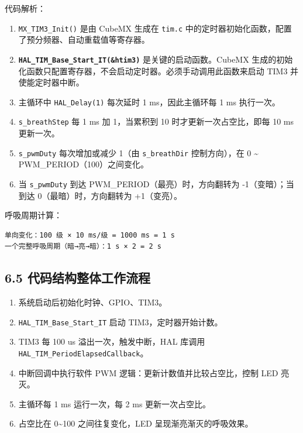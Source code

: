 \documentclass[
  chinese,
  UTF8,
  oneside,
  openany]{ctexbook}
\providecommand{\tightlist}{%
  \setlength{\itemsep}{0pt}\setlength{\parskip}{0pt}}
\begin{document}
代码解析：

\begin{enumerate}
\def\labelenumi{\arabic{enumi}.}
\tightlist
\item
  \texttt{MX\_TIM3\_Init()} 是由 CubeMX 生成在 \texttt{tim.c}
  中的定时器初始化函数，配置了预分频器、自动重载值等寄存器。
\item
  \textbf{\texttt{HAL\_TIM\_Base\_Start\_IT(\&htim3)}}
  是关键的启动函数。CubeMX
  生成的初始化函数只配置寄存器，不会启动定时器。必须手动调用此函数来启动
  TIM3 并使能定时器中断。
\item
  主循环中 \texttt{HAL\_Delay(1)} 每次延时 1 ms，因此主循环每 1 ms
  执行一次。
\item
  \texttt{s\_breathStep} 每 1 ms 加 1，当累积到 10
  时才更新一次占空比，即每 10 ms 更新一次。
\item
  \texttt{s\_pwmDuty} 每次增加或减少 1（由 \texttt{s\_breathDir}
  控制方向），在 0 \textasciitilde{} PWM\_PERIOD（100）之间变化。
\item
  当 \texttt{s\_pwmDuty} 到达 PWM\_PERIOD（最亮）时，方向翻转为
  -1（变暗）；当到达 0（最暗）时，方向翻转为 +1（变亮）。
\end{enumerate}

呼吸周期计算：

\begin{verbatim}
单向变化：100 级 × 10 ms/级 = 1000 ms = 1 s
一个完整呼吸周期（暗→亮→暗）：1 s × 2 = 2 s
\end{verbatim}

\subsection{6.5
代码结构整体工作流程}\label{ux4ee3ux7801ux7ed3ux6784ux6574ux4f53ux5de5ux4f5cux6d41ux7a0b}

\begin{enumerate}
\def\labelenumi{\arabic{enumi}.}
\tightlist
\item
  系统启动后初始化时钟、GPIO、TIM3。
\item
  \texttt{HAL\_TIM\_Base\_Start\_IT} 启动 TIM3，定时器开始计数。
\item
  TIM3 每 100 us 溢出一次，触发中断，HAL 库调用
  \texttt{HAL\_TIM\_PeriodElapsedCallback}。
\item
  中断回调中执行软件 PWM 逻辑：更新计数值并比较占空比，控制 LED 亮灭。
\item
  主循环每 1 ms 运行一次，每 2 ms 更新一次占空比。
\item
  占空比在 0\textasciitilde100 之间往复变化，LED
  呈现渐亮渐灭的呼吸效果。
\end{enumerate}
\end{document}
